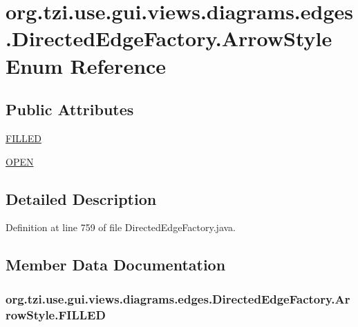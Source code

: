 \hypertarget{enumorg_1_1tzi_1_1use_1_1gui_1_1views_1_1diagrams_1_1edges_1_1_directed_edge_factory_1_1_arrow_style}{\section{org.\-tzi.\-use.\-gui.\-views.\-diagrams.\-edges.\-Directed\-Edge\-Factory.\-Arrow\-Style Enum Reference}
\label{enumorg_1_1tzi_1_1use_1_1gui_1_1views_1_1diagrams_1_1edges_1_1_directed_edge_factory_1_1_arrow_style}
}
\subsection*{Public Attributes}
\begin{DoxyCompactItemize}
\item 
\hyperlink{enumorg_1_1tzi_1_1use_1_1gui_1_1views_1_1diagrams_1_1edges_1_1_directed_edge_factory_1_1_arrow_style_a1a0f373d8638b769569f5e0ab62e7980}{F\-I\-L\-L\-E\-D}
\item 
\hyperlink{enumorg_1_1tzi_1_1use_1_1gui_1_1views_1_1diagrams_1_1edges_1_1_directed_edge_factory_1_1_arrow_style_a71eedeacc618ab89e7567623973c653b}{O\-P\-E\-N}
\end{DoxyCompactItemize}


\subsection{Detailed Description}


Definition at line 759 of file Directed\-Edge\-Factory.\-java.



\subsection{Member Data Documentation}
\hypertarget{enumorg_1_1tzi_1_1use_1_1gui_1_1views_1_1diagrams_1_1edges_1_1_directed_edge_factory_1_1_arrow_style_a1a0f373d8638b769569f5e0ab62e7980}{
\subsubsection[{F\-I\-L\-L\-E\-D}]{\setlength{\rightskip}{0pt plus 5cm}org.\-tzi.\-use.\-gui.\-views.\-diagrams.\-edges.\-Directed\-Edge\-Factory.\-Arrow\-Style.\-F\-I\-L\-L\-E\-D}}\label{enumorg_1_1tzi_1_1use_1_1gui_1_1views_1_1diagrams_1_1edges_1_1_directed_edge_factory_1_1_arrow_style_a1a0f373d8638b769569f5e0ab62e7980}


